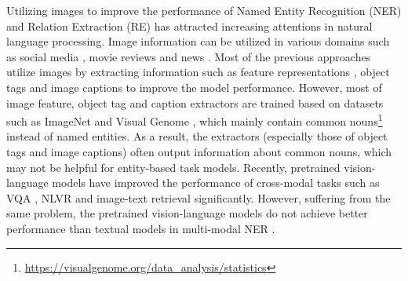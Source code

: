 \documentclass[11pt]{article}
\begin{document}
Utilizing images to improve the performance of Named Entity Recognition (NER) and Relation Extraction (RE) has attracted increasing attentions in natural language processing. Image information can be utilized in various domains such as social media \citep{zhang2018adaptive,moon-etal-2018-multimodal,lu-etal-2018-visual,zheng2021mnre}, movie reviews \citep{10.1145/3474085.3475400} and news \citep{wang2022wikidiverse}. Most of the previous approaches utilize images by extracting information such as feature representations \citep{moon-etal-2018-multimodal,yu-etal-2020-improving-multimodal}, object tags \citep{10.1145/3394171.3413650,zheng2021multimodal} and image captions \citep{wang2022ita} to improve the model performance. 
However, most of image feature, object tag and caption extractors are trained based on datasets such as ImageNet \citep{imagenet_cvpr09} and Visual Genome \citep{krishnavisualgenome}, which mainly contain common nouns\footnote{\url{https://visualgenome.org/data_analysis/statistics}} instead of named entities. As a result, the extractors (especially those of object tags and image captions) often output information about common nouns, which may not be helpful for entity-based task models. Recently, pretrained vision-language models \citep{Tan2019LXMERTLC,chen2020uniter,li2020oscar} have improved the performance of cross-modal tasks such as VQA \citep{Agrawal2015VQAVQ}, NLVR \citep{Young2014FromID} and image-text retrieval \citep{Suhr2019ACF} significantly. However, suffering from the same problem, the pretrained vision-language models do not achieve better performance than textual models in multi-modal NER \citep{Sun2021RpBERTAT,wang2022ita}.
\end{document}
